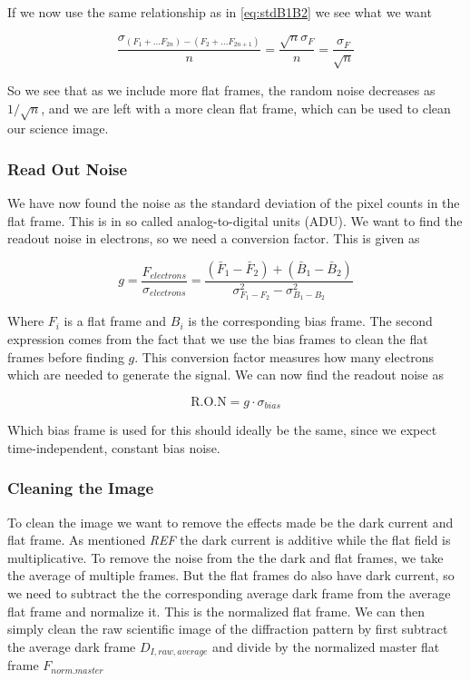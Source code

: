\documentclass{emulateapj}
\begin{document}
If we now use the same relationship as in \eqref{eq:stdB1B2} we see what we want

\begin{equation}
\frac{\sigma_{(F_1 + \ldots F_{2n})- (F_2 + \ldots F_{2n+1})}}{n} = \frac{\sqrt{n}\sigma_F}{n} = \frac{\sigma_F}{\sqrt{n}}
\end{equation}

So we see that as we include more flat frames, the random noise decreases as $1/\sqrt{n}$, and we are left with a more clean flat frame, which can be used to clean our science image.

\subsubsection{Read Out Noise}

We have now found the noise as the standard deviation of the pixel counts in the flat frame. This is in so called analog-to-digital units (ADU). We want to find the readout noise in electrons, so we need a conversion factor. This is given as

\begin{equation}
g = \frac{F_{electrons}}{\sigma_{electrons}} = \frac{(\bar{F}_1 - \bar{F}_2) + (\bar{B}_1-\bar{B}_2)}{\sigma_{F_1 - F_2}^2 - \sigma_{B_1 - B_2}^2}
\label{eq:g}
\end{equation}

Where $F_i$ is a flat frame and $B_i$ is the corresponding bias frame. The second expression comes from the fact that we use the bias frames to clean the flat frames before finding $g$. This conversion factor measures how many electrons which are needed to generate the signal. We can now find the readout noise as

\begin{equation}
\text{R.O.N} = g\cdot\sigma_{bias}
\end{equation}

Which bias frame is used for this should ideally be the same, since we expect time-independent, constant bias noise.

\subsubsection{Cleaning the Image}
\label{sec:cleaning}
To clean the image we want to remove the effects made be the dark current and flat frame. As mentioned \emph{REF} the dark current is additive while the flat field is multiplicative. To remove the noise from the the dark and flat frames, we take the average of multiple frames. But the flat frames do also have dark current, so we need to subtract the the corresponding average dark frame from the average flat frame and normalize it. This is the normalized flat frame. We can then simply clean the raw scientific image of the diffraction pattern by first subtract the average dark frame $D_{I,raw,average}$ and divide by the normalized master flat frame $F_{norm. master}$
\end{document}
